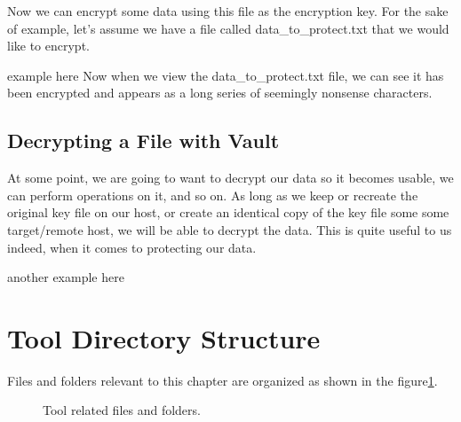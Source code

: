 \justify{}
Now we can encrypt some data using this file as the encryption key. For
the sake of example, let's assume we have a file called
data\_to\_protect.txt that we would like to encrypt.

example here
\justify{}
Now when we view the data\_to\_protect.txt file, we can see it has been
encrypted and appears as a long series of seemingly nonsense characters.

\subsection{Decrypting a File with Vault}
\justify{}
At some point, we are going to want to decrypt our data so it becomes
usable, we can perform operations on it, and so on. As long as we keep
or recreate the original key file on our host, or create an identical
copy of the key file some some target/remote host, we will be able to
decrypt the data. This is quite useful to us indeed, when it comes to
protecting our data.

another example here

\clearpage

\section{Tool Directory Structure}
\justify{}
Files and folders relevant to this chapter are organized as shown in
the figure\ref{toolsfiles}.

\begin{figure}[!htb]
	
	\caption{Tool related files and folders.}
\label{toolsfiles}
\end{figure}
